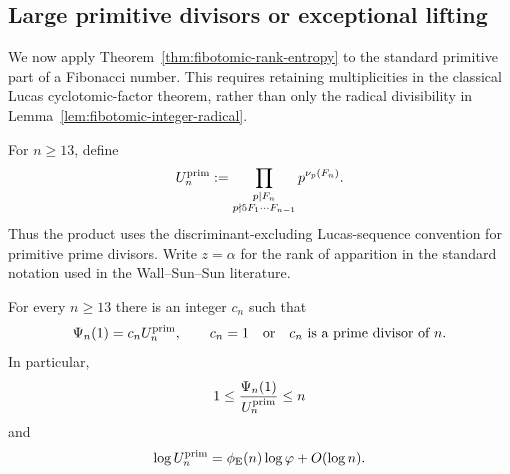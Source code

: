 \subsection{Large primitive divisors or exceptional lifting}
\label{subsec:large-primitive-alternative}

We now apply Theorem~\ref{thm:fibotomic-rank-entropy} to the standard
primitive part of a Fibonacci number.  This requires retaining multiplicities
in the classical Lucas cyclotomic-factor theorem, rather than only the radical
divisibility in Lemma~\ref{lem:fibotomic-integer-radical}.

For $n\geq13$, define
\[
 U_n^{\rm prim}:=
 \prod_{\substack{p\mid F_n\\p\nmid 5F_1\cdots F_{n-1}}}
 p^{\nu_p(F_n)}.
\]
Thus the product uses the discriminant-excluding Lucas-sequence convention
for primitive prime divisors.  Write $z=\alpha$ for the rank of apparition in
the standard notation used in the Wall--Sun--Sun literature.

\begin{lemma}
\label{lem:classical-primitive-part}
For every $n\geq13$ there is an integer $c_n$ such that
\begin{equation}\label{eq:primitive-part-factorization}
 \Psi_n(1)=c_nU_n^{\rm prim},
 \qquad
 c_n=1\quad\text{or}\quad c_n\text{ is a prime divisor of }n.
\end{equation}
In particular,
\begin{equation}\label{eq:primitive-part-ratio}
 1\leq\frac{\Psi_n(1)}{U_n^{\rm prim}}\leq n
\end{equation}
and
\begin{equation}\label{eq:primitive-part-log-mass}
 \log U_n^{\rm prim}
 =\phi_{\rm E}(n)\log\varphi+O(\log n).
\end{equation}
\end{lemma}

